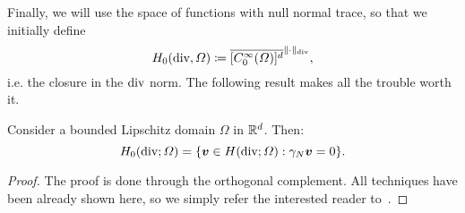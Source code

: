 Finally, we will use the space of functions with null normal trace, so that we initially define
\begin{equation}\label{eq:def-H0div-closure}
H_0(\operatorname{\text{div}}, \Omega) \coloneqq \overline{[C_0^\infty(\Omega)]^d}^{\|\cdot \|_{\operatorname{\text{div}}}},
\end{equation}
i.e. the closure in the $\operatorname{\text{div}}$ norm. The following result makes all the trouble worth it. 
\begin{theorem}
Consider a bounded Lipschitz domain $\Omega$ in $\mathbb{R}^d$. Then: 
\begin{equation}\label{def-H0div-kernel}
H_0(\dive;\Omega) = \{\vec v\in H(\dive;\Omega): \gamma_N \vec v = 0 \}.
\end{equation}
\begin{proof}
    The proof is done through the orthogonal complement. All techniques have been already shown here, so we simply refer the interested reader to~\cite[Thm 3.25]{monk2003finite}.
\end{proof}
\end{theorem}


